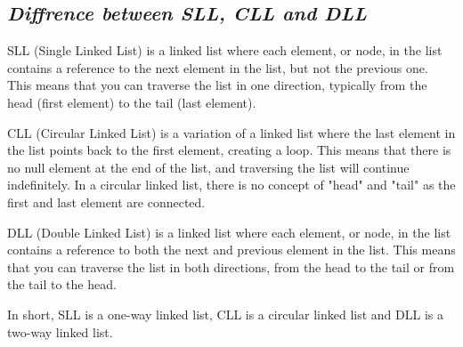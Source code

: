 \documentclass{article}
\begin{document}
\subsection{\textbf{\textit{Diffrence between SLL, CLL and DLL}}}
SLL (Single Linked List) is a linked list where each element, or node, in the list contains a reference to the next element in the list, but not the previous one. This means that you can traverse the list in one direction, typically from the head (first element) to the tail (last element).

CLL (Circular Linked List) is a variation of a linked list where the last element in the list points back to the first element, creating a loop. This means that there is no null element at the end of the list, and traversing the list will continue indefinitely. In a circular linked list, there is no concept of "head" and "tail" as the first and last element are connected.

DLL (Double Linked List) is a linked list where each element, or node, in the list contains a reference to both the next and previous element in the list. This means that you can traverse the list in both directions, from the head to the tail or from the tail to the head.

In short, SLL is a one-way linked list, CLL is a circular linked list and DLL is a two-way linked list.
\end{document}
